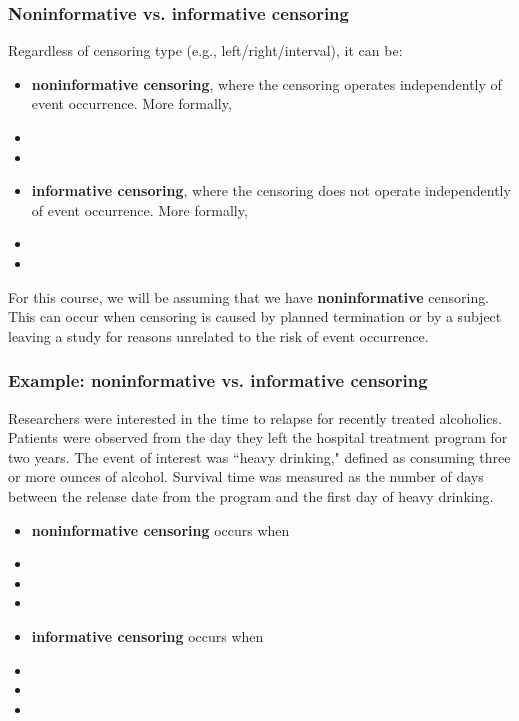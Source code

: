 \begin{frame}
\frametitle{Noninformative vs. informative censoring}
Regardless of censoring type (e.g., left/right/interval), it can be:
\begin{itemize}
\item \textbf{noninformative censoring}, where the censoring operates independently of event occurrence.  More formally,
\item[] %
\item[]
\item \textbf{informative censoring}, where the censoring does not operate independently of event occurrence. More formally,
\item[] %
\item[]
\end{itemize}
For this course, we will be assuming that we have \textbf{noninformative} censoring.  This can occur when censoring is caused by planned
termination or by a subject leaving a study for reasons unrelated to the risk of event occurrence.
\end{frame}

\begin{frame}
\frametitle{Example: noninformative vs. informative censoring}
\small{Researchers were interested in the time to relapse for recently treated alcoholics. Patients were observed from the day they left the hospital treatment program for two years. The event of interest was ``heavy drinking," defined as consuming three or more ounces of alcohol. Survival time was measured as the number of days between the release date from the program and the first day of heavy drinking.}
\begin{itemize}
\item \textbf{noninformative censoring} occurs when
\item[] %
\item[]
\item[]
\item \textbf{informative censoring} occurs when
\item[] %
\item[]
\item[]
\end{itemize}
\end{frame}

